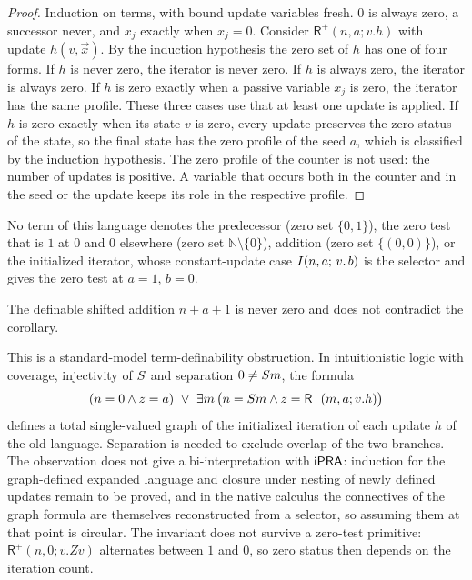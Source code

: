 \begin{proof}
Induction on terms, with bound update variables fresh. $0$ is always zero, a
successor never, and $x_j$ exactly when $x_j=0$. Consider
$\mathsf{R}^{+}(n,a;v.h)$ with update $h(v,\vec x)$. By the induction
hypothesis the zero set of $h$ has one of four forms. If $h$ is never zero, the
iterator is never zero. If $h$ is always zero, the iterator is always zero. If
$h$ is zero exactly when a passive variable $x_j$ is zero, the iterator has the
same profile. These three cases use that at least one update is applied. If
$h$ is zero exactly when its state $v$ is zero, every update preserves the zero
status of the state, so the final state has the zero profile of the seed $a$,
which is classified by the induction hypothesis. The zero profile of the
counter is not used: the number of updates is positive. A variable that occurs
both in the counter and in the seed or the update keeps its role in the
respective profile.
\end{proof}

\begin{corollary}
\label{obs:cor:zeroprofile}
No term of this language denotes the predecessor (zero set $\{0,1\}$), the zero
test that is $1$ at $0$ and $0$ elsewhere (zero set $\mathbb{N}\setminus\{0\}$),
addition (zero set $\{(0,0)\}$), or the initialized iterator, whose
constant-update case $I(n,a;\,v.\,b)$ is the selector and gives the zero test
at $a=1$, $b=0$.
\end{corollary}

The definable shifted addition $n+a+1$ is never zero and does not contradict
the corollary.

\begin{remark}[Scope]
\label{obs:rem:zeroprofile-scope}
This is a standard-model term-definability obstruction. In intuitionistic
logic with coverage, injectivity of $S$ and separation $0\ne S m$, the
formula
\[
(n=0\wedge z=a)\ \vee\ \exists m\,\bigl(n=S m\wedge z=\mathsf{R}^{+}(m,a;v.h)\bigr)
\]
defines a total single-valued graph of the initialized iteration of each
update $h$ of the old language. Separation is needed to exclude overlap of the
two branches. The observation does not give a bi-interpretation with $\mathsf{iPRA}$:
induction for the graph-defined expanded language and closure under nesting of
newly defined updates remain to be proved, and in the native calculus the
connectives of the graph formula are themselves reconstructed from a selector,
so assuming them at that point is circular. The invariant does not survive a
zero-test primitive: $\mathsf{R}^{+}(n,0;v.Z v)$ alternates between $1$ and
$0$, so zero status then depends on the iteration count.
\end{remark}

